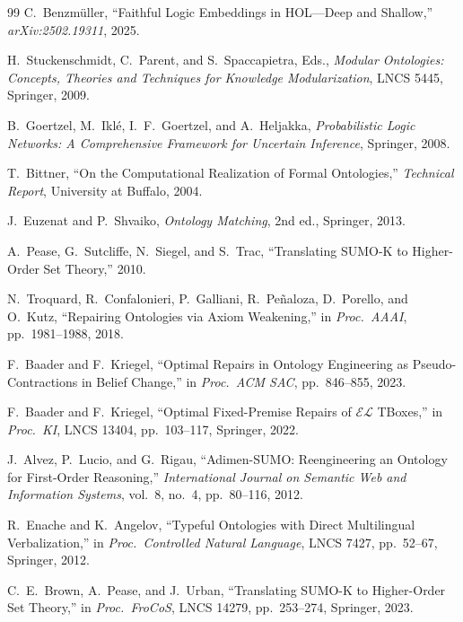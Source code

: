 \documentclass[11pt]{article}
\theoremstyle{definition}
\theoremstyle{plain}
\begin{document}
\begin{thebibliography}{99}
C.~Benzm\"uller,
``Faithful Logic Embeddings in HOL---Deep and Shallow,''
\textit{arXiv:2502.19311}, 2025.

H.~Stuckenschmidt, C.~Parent, and S.~Spaccapietra, Eds.,
\textit{Modular Ontologies: Concepts, Theories and Techniques for
Knowledge Modularization},
LNCS 5445, Springer, 2009.

B.~Goertzel, M.~Iklé, I.~F.~Goertzel, and A.~Heljakka,
\textit{Probabilistic Logic Networks: A Comprehensive Framework for
Uncertain Inference},
Springer, 2008.

T.~Bittner,
``On the Computational Realization of Formal Ontologies,''
\textit{Technical Report}, University at Buffalo, 2004.

J.~Euzenat and P.~Shvaiko,
\textit{Ontology Matching}, 2nd ed., Springer, 2013.

A.~Pease, G.~Sutcliffe, N.~Siegel, and S.~Trac,
``Translating SUMO-K to Higher-Order Set Theory,''
2010.

N.~Troquard, R.~Confalonieri, P.~Galliani, R.~Pe\~naloza,
D.~Porello, and O.~Kutz,
``Repairing Ontologies via Axiom Weakening,''
in \textit{Proc.\ AAAI}, pp.~1981--1988, 2018.

F.~Baader and F.~Kriegel,
``Optimal Repairs in Ontology Engineering as Pseudo-Contractions
in Belief Change,''
in \textit{Proc.\ ACM SAC}, pp.~846--855, 2023.

F.~Baader and F.~Kriegel,
``Optimal Fixed-Premise Repairs of $\mathcal{EL}$ TBoxes,''
in \textit{Proc.\ KI}, LNCS 13404, pp.~103--117, Springer, 2022.

J.~Alvez, P.~Lucio, and G.~Rigau,
``Adimen-SUMO: Reengineering an Ontology for First-Order Reasoning,''
\textit{International Journal on Semantic Web and Information Systems},
vol.~8, no.~4, pp.~80--116, 2012.

R.~Enache and K.~Angelov,
``Typeful Ontologies with Direct Multilingual Verbalization,''
in \textit{Proc.\ Controlled Natural Language}, LNCS 7427,
pp.~52--67, Springer, 2012.

C.~E.~Brown, A.~Pease, and J.~Urban,
``Translating SUMO-K to Higher-Order Set Theory,''
in \textit{Proc.\ FroCoS}, LNCS 14279, pp.~253--274, Springer, 2023.


\end{thebibliography}
\end{document}
